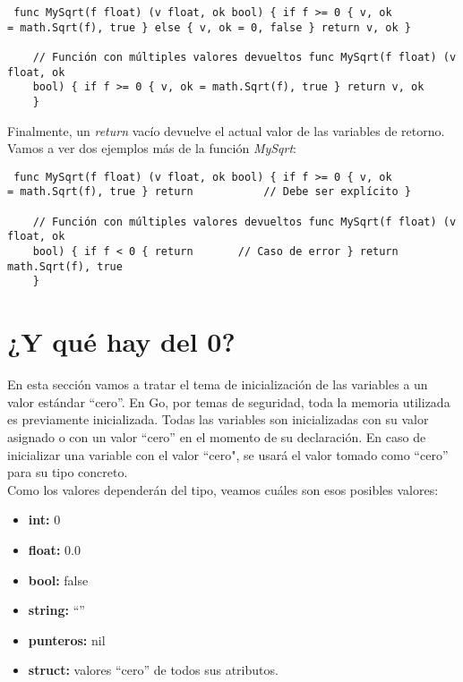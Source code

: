 \begin{verbatim} func MySqrt(f float) (v float, ok bool) { if f >= 0 { v, ok
= math.Sqrt(f), true } else { v, ok = 0, false } return v, ok }    
    
	// Función con múltiples valores devueltos func MySqrt(f float) (v float, ok
	bool) { if f >= 0 { v, ok = math.Sqrt(f), true } return v, ok
	}    \end{verbatim}

Finalmente, un \textit{return} vacío devuelve el actual valor de las variables
de retorno. Vamos a ver dos ejemplos más de la función \textit{MySqrt}:

\begin{verbatim} func MySqrt(f float) (v float, ok bool) { if f >= 0 { v, ok
= math.Sqrt(f), true } return           // Debe ser explícito }    
    
	// Función con múltiples valores devueltos func MySqrt(f float) (v float, ok
	bool) { if f < 0 { return       // Caso de error } return math.Sqrt(f), true
	}    \end{verbatim}

\section{¿Y qué hay del 0?}

En esta sección vamos a tratar el tema de inicialización de las variables a un
valor estándar ``cero''. En Go, por temas de seguridad, toda la memoria
utilizada es previamente inicializada. Todas las variables son inicializadas con
su valor asignado o con un valor ``cero'' en el momento de su declaración. En
caso de inicializar una variable con el valor ``cero", se usará el valor tomado
como ``cero'' para su tipo concreto.\\

Como los valores dependerán del tipo, veamos cuáles son esos posibles valores:

\begin{itemize} \item \textbf{int:} 0 \item \textbf{float:} 0.0 \item
\textbf{bool:} false \item \textbf{string:} ``'' \item \textbf{punteros:} nil
\item \textbf{struct:} valores ``cero'' de todos sus atributos.  \end{itemize}

